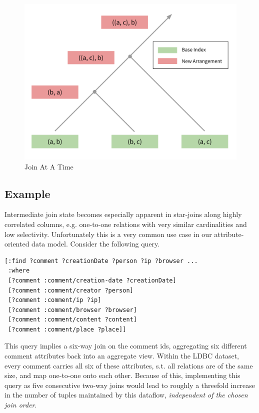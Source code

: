 \documentclass[../catalog.tex]{subfiles}
\begin{document}
\begin{figure}[h!]
  \includegraphics[width=1.0\linewidth]{diagrams/join-at-a-time}
  \caption{Join At A Time}
  \label{fig:join-at-a-time-plan}
\end{figure}

\subsection{Example}

Intermediate join state becomes especially apparent in star-joins
along highly correlated columns, e.g. one-to-one relations with very
similar cardinalities and low selectivity. Unfortunately this is a
very common use case in our attribute-oriented data model. Consider
the following query.

\begin{verbatim}
[:find ?comment ?creationDate ?person ?ip ?browser ...
 :where
 [?comment :comment/creation-date ?creationDate]
 [?comment :comment/creator ?person]
 [?comment :comment/ip ?ip]
 [?comment :comment/browser ?browser]
 [?comment :comment/content ?content]
 [?comment :comment/place ?place]]
\end{verbatim}

This query implies a six-way join on the comment ids, aggregating six
different comment attributes back into an aggregate view. Within the
LDBC dataset, every comment carries all six of these attributes,
s.t. all relations are of the same size, and map one-to-one onto each
other. Because of this, implementing this query as five consecutive
two-way joins would lead to roughly a threefold increase in the number
of tuples maintained by this dataflow, \emph{independent of the chosen
  join order}.
\end{document}
